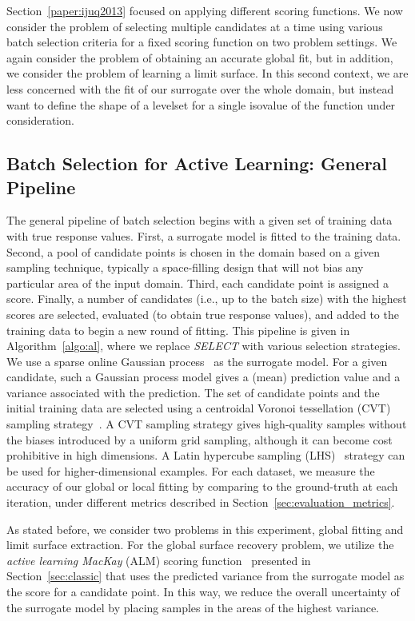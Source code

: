 Section~\ref{paper:ijuq2013} focused on applying different scoring functions.
%
We now consider the problem of selecting multiple candidates at a time using various batch selection criteria for a fixed scoring function on two problem settings.
%
We again consider the problem of obtaining an accurate global fit, but in addition, we consider the problem of learning a limit surface.
%
In this second context, we are less concerned with the fit of our surrogate over the whole domain, but instead want to define the shape of a levelset for a single isovalue of the function under consideration.


\subsection{Batch Selection for Active Learning: General Pipeline}
The general pipeline of batch selection begins with a given set of training data with true response values.
%
First, a surrogate model is fitted to the training data.
%
Second, a pool of candidate points is chosen in the domain based on a given sampling technique, typically a space-filling design that will not bias any particular area of the input domain.
%
Third, each candidate point is assigned a score.
%
Finally, a number of candidates (i.e., up to the batch size) with the highest scores are selected, evaluated (to obtain true response values), and added to the training data to begin a new round of fitting.
%
This pipeline is given in Algorithm~\ref{algo:al}, where we replace \textit{SELECT} with various selection strategies.
%
We use a sparse online Gaussian process~\cite{CsatoOpper2002} as the surrogate model.
%
For a given candidate, such a Gaussian process model gives a (mean) prediction value and a variance associated with the prediction.
%
The set of candidate points and the initial training data are selected using a centroidal Voronoi tessellation (CVT) sampling strategy~\cite{DuFaberGunzburger1999}.
%
A CVT sampling strategy gives high-quality samples without the biases introduced by a uniform grid sampling, although it can become cost prohibitive in high dimensions.
%
A Latin hypercube sampling (LHS)~\cite{ImanDavenportZeigler1980} strategy can be used for higher-dimensional examples.
%
For each dataset, we measure the accuracy of our global or local fitting by comparing to the ground-truth at each iteration, under different metrics described in Section~\ref{sec:evaluation_metrics}.

As stated before, we consider two problems in this experiment, global fitting and limit surface extraction.
%
For the global surface recovery problem, we utilize the \emph{active learning MacKay} (ALM) scoring function~\cite{MacKay1992} presented in Section~\ref{sec:classic} that uses the predicted variance from the surrogate model as the score for a candidate point.
%
In this way, we reduce the overall uncertainty of the surrogate model by placing samples in the areas of the highest variance.

